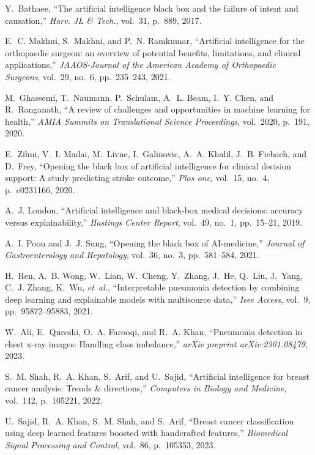 \documentclass{article}
\begin{document}
\begin{thebibliography}{100}
	Y.~Bathaee, ``The artificial intelligence black box and the failure of intent
	and causation,'' {\em Harv. JL \& Tech.}, vol.~31, p.~889, 2017.
	
	E.~C. Makhni, S.~Makhni, and P.~N. Ramkumar, ``Artificial intelligence for the
	orthopaedic surgeon: an overview of potential benefits, limitations, and
	clinical applications,'' {\em JAAOS-Journal of the American Academy of
		Orthopaedic Surgeons}, vol.~29, no.~6, pp.~235--243, 2021.
	
	M.~Ghassemi, T.~Naumann, P.~Schulam, A.~L. Beam, I.~Y. Chen, and R.~Ranganath,
	``A review of challenges and opportunities in machine learning for health,''
	{\em AMIA Summits on Translational Science Proceedings}, vol.~2020, p.~191,
	2020.
	
	E.~Zihni, V.~I. Madai, M.~Livne, I.~Galinovic, A.~A. Khalil, J.~B. Fiebach, and
	D.~Frey, ``Opening the black box of artificial intelligence for clinical
	decision support: A study predicting stroke outcome,'' {\em Plos one},
	vol.~15, no.~4, p.~e0231166, 2020.
	
	A.~J. London, ``Artificial intelligence and black-box medical decisions:
	accuracy versus explainability,'' {\em Hastings Center Report}, vol.~49,
	no.~1, pp.~15--21, 2019.
	
	A.~I. Poon and J.~J. Sung, ``Opening the black box of {AI}-medicine,'' {\em
		Journal of Gastroenterology and Hepatology}, vol.~36, no.~3, pp.~581--584,
	2021.
	
	H.~Ren, A.~B. Wong, W.~Lian, W.~Cheng, Y.~Zhang, J.~He, Q.~Liu, J.~Yang, C.~J.
	Zhang, K.~Wu, {\em et~al.}, ``Interpretable pneumonia detection by combining
	deep learning and explainable models with multisource data,'' {\em Ieee
		Access}, vol.~9, pp.~95872--95883, 2021.
	
	W.~Ali, E.~Qureshi, O.~A. Farooqi, and R.~A. Khan, ``Pneumonia detection in
	chest x-ray images: Handling class imbalance,'' {\em arXiv preprint
		arXiv:2301.08479}, 2023.
	
	S.~M. Shah, R.~A. Khan, S.~Arif, and U.~Sajid, ``Artificial intelligence for
	breast cancer analysis: Trends \& directions,'' {\em Computers in Biology and
		Medicine}, vol.~142, p.~105221, 2022.
	
	U.~Sajid, R.~A. Khan, S.~M. Shah, and S.~Arif, ``Breast cancer classification
	using deep learned features boosted with handcrafted features,'' {\em
		Biomedical Signal Processing and Control}, vol.~86, p.~105353, 2023.
	

\end{thebibliography}
\end{document}
